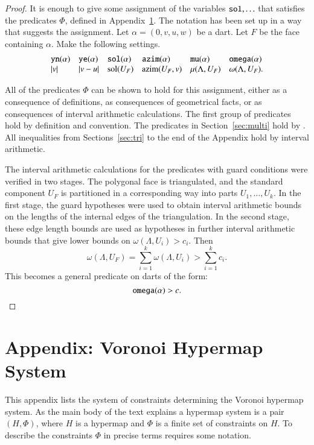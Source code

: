 \begin{proof}  It is enough to give some assignment of the variables
${\operatorname{{\texttt{sol}}}},\ldots$ that satisfies the predicates $\Phi$, defined
in Appendix~\ref{ap:A}.  The notation has been set up in a way that
suggests the assignment.  
Let $\alpha = (0,v,u,w)$ be a dart.  Let $F$ be the face containing $\alpha$. Make the following settings.
$$
\begin{array}{llllllllllll}
{\operatorname{{\texttt{yn}}}}(\alpha) & {\operatorname{{\texttt{ye}}}}(\alpha) & {\operatorname{{\texttt{sol}}}}(\alpha) & {\operatorname{{\texttt{azim}}}}(\alpha) & {\operatorname{{\texttt{mu}}}}(\alpha) & {\operatorname{{\texttt{omega}}}}(\alpha) \\
|v|               & |v-u|           & \operatorname{sol}(U_F)   & {\operatorname{azim}}(U_F,v) & \mu(\Lambda,U_F) & \omega(\Lambda,U_F).\\
\end{array}
$$

All of the predicates $\Phi$ can be shown to hold for this assignment,
either as a consequence of definitions, as consequences of geometrical facts, or
as consequences of interval arithmetic calculations.
The first group of predicates hold by definition and convention.
%
The predicates in Section~\ref{sec:multi} hold by \cite[Lemma~5.2]{arx}.
%
All inequalities from Sections~\ref{sec:tri} to the end of the
Appendix hold by interval arithmetic.

The interval arithmetic calculations for the predicates with guard
conditions were verified in two stages.  
The polygonal face is triangulated, and
the standard component $U_F$ is partitioned in a corresponding
way into parts $U_1,\ldots,U_k$.
In the first stage,
the guard hypotheses were used to obtain interval
arithmetic bounds on the lengths of the internal edges of the triangulation.
In the second stage, these edge length bounds are used as hypotheses
in further interval arithmetic bounds that give lower bounds on
$\omega(\Lambda,U_i) > c_i$.  Then
  $$\omega(\Lambda,U_F) = \sum_{i=1}^k\omega(\Lambda,U_i) >\sum_{i=1}^k c_i.$$
This becomes a general predicate on darts of the form:
$$
{\operatorname{{\texttt{omega}}}}(\alpha) > c.
$$
\end{proof}


\section{Appendix: Voronoi Hypermap System}\label{ap:A}

This appendix  lists the system of constraints determining
the Voronoi hypermap system.  As the main body of the text explains
a hypermap system is a pair $(H,\Phi)$, where $H$ is a hypermap
and $\Phi$ is a finite set of constraints on $H$.  To describe
the constraints $\Phi$ in precise terms requires some notation.

